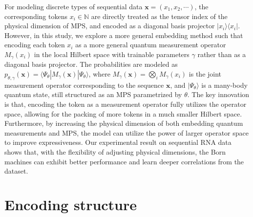 \documentclass[aps,prb,twocolumn,superscriptaddress]{revtex4-2}
\newcommand{\bra}[1]{\langle #1|}
\newcommand{\ket}[1]{|#1 \rangle}
\newcommand{\dsN}{\mathbb{N}}
\newcommand{\vect}[1]{{\bm{#1}}}
\begin{document}
For modeling discrete types of sequential data $\vect{x}=(x_1,x_2,\cdots)$, the corresponding tokens $x_i\in \dsN$ are directly treated as the tensor index of the physical dimension of MPS, and encoded as a diagonal basis projector $\ket{x_i}\bra{x_i}$. However, in this study, we explore a more general embedding method such that encoding each token $x_i$ as a more general quantum measurement operator $M_{\gamma}(x_i)$ in the local Hilbert space with trainable parameters $\gamma$ rather than as a diagonal basis projector. The probabilities are modeled as $p_{\theta,\gamma}(\vect{x})=\bra{\Psi_\theta}M_{\gamma}(\vect{x})\ket{\Psi_\theta}$, where $M_\gamma(\vect{x})=\bigotimes_i M_\gamma(x_i)$ is the joint measurement operator corresponding to the sequence $\vect{x}$, and $\ket{\Psi_\theta}$ is a many-body quantum state, still structured as an MPS parametrized by $\theta$. The key innovation is that, encoding the token as a measurement operator fully utilizes the operator space, allowing for the packing of more tokens in a much smaller Hilbert space. Furthermore, by increasing the physical dimension of both embedding quantum measurements and MPS, the model can utilize the power of larger operator space to improve expressiveness. Our experimental result on sequential RNA data shows that, with the flexibility of adjusting physical dimensions, the Born machines can exhibit better performance and learn deeper correlations from the dataset.

\section{Encoding structure}
\end{document}
